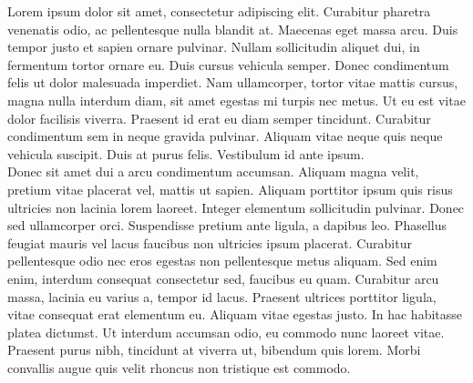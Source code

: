 %
Lorem ipsum dolor sit amet, consectetur adipiscing elit. Curabitur pharetra venenatis odio, ac pellentesque nulla blandit at. Maecenas eget massa arcu. Duis tempor justo et sapien ornare pulvinar. Nullam sollicitudin aliquet dui, in fermentum tortor ornare eu. Duis cursus vehicula semper. Donec condimentum felis ut dolor malesuada imperdiet. Nam ullamcorper, tortor vitae mattis cursus, magna nulla interdum diam, sit amet egestas mi turpis nec metus. Ut eu est vitae dolor facilisis viverra. Praesent id erat eu diam semper tincidunt. Curabitur condimentum sem in neque gravida pulvinar. Aliquam vitae neque quis neque vehicula suscipit. Duis at purus felis. Vestibulum id ante ipsum. \\

Donec sit amet dui a arcu condimentum accumsan. Aliquam magna velit, pretium vitae placerat vel, mattis ut sapien. Aliquam porttitor ipsum quis risus ultricies non lacinia lorem laoreet. Integer elementum sollicitudin pulvinar. Donec sed ullamcorper orci. Suspendisse pretium ante ligula, a dapibus leo. Phasellus feugiat mauris vel lacus faucibus non ultricies ipsum placerat. Curabitur pellentesque odio nec eros egestas non pellentesque metus aliquam. Sed enim enim, interdum consequat consectetur sed, faucibus eu quam. Curabitur arcu massa, lacinia eu varius a, tempor id lacus. Praesent ultrices porttitor ligula, vitae consequat erat elementum eu. Aliquam vitae egestas justo. In hac habitasse platea dictumst. Ut interdum accumsan odio, eu commodo nunc laoreet vitae. Praesent purus nibh, tincidunt at viverra ut, bibendum quis lorem. Morbi convallis augue quis velit rhoncus non tristique est commodo.

